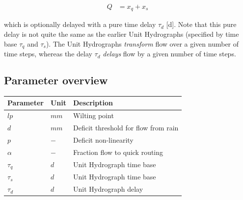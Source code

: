 \begin{align}
	Q &= x_q+x_s
\end{align}

which is optionally delayed with a pure time delay $\tau_d$ [d]. Note that this pure delay is not quite the same as the earlier Unit Hydrographs (specified by time base $\tau_q$ and $\tau_s$). The Unit Hydrographs \emph{transform} flow over a given number of time steps, whereas the delay $\tau_d$ \emph{delays} flow by a given number of time steps.

\subsection{Parameter overview}
\begin{table}[htbp]
  \centering
    \begin{tabular}{lll}
    \toprule
    Parameter & Unit  & Description \\
    \midrule
    $lp$  & $mm$  & Wilting point \\
    $d$   & $mm$  & Deficit threshold for flow from rain \\
    $p$   & $-$   & Deficit non-linearity \\
    $\alpha$ & $-$   & Fraction flow to quick routing \\
    $\tau_q$ & $d$   & Unit Hydrograph time base \\
    $\tau_s$ & $d$   & Unit Hydrograph time base \\
    $\tau_d$ & $d$   & Unit Hydrograph delay \\
    \bottomrule
    \end{tabular}%
  \label{tab:addlabel}%
\end{table}%


